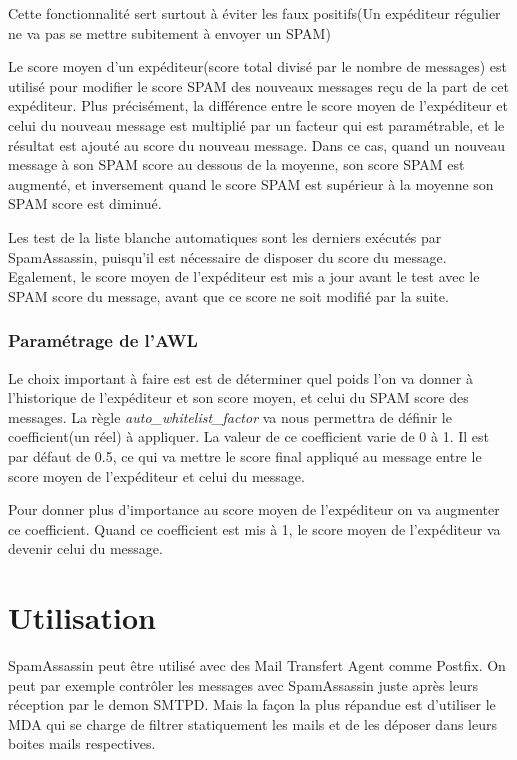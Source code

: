 \documentclass[a4paper,11pt]{article}
\begin{document}
Cette fonctionnalité sert surtout à éviter les faux positifs(Un expéditeur régulier ne va pas se mettre subitement à envoyer un SPAM)

Le score moyen d'un expéditeur(score total divisé par le nombre de messages) est utilisé pour modifier  
le score SPAM des nouveaux messages reçu de la part de cet expéditeur. Plus précisément, la différence entre le score 
moyen de l’expéditeur et celui du nouveau message est multiplié par un facteur qui est paramétrable,
et le résultat est ajouté au score du nouveau message. Dans ce cas, quand un nouveau message à son SPAM score 
au dessous de la moyenne, son score SPAM est augmenté, et inversement quand le score SPAM est supérieur à la moyenne
son SPAM score est diminué.

Les test de la liste blanche automatiques sont les derniers exécutés par SpamAssassin, puisqu'il est nécessaire de disposer du score du message.
Egalement, le score moyen de l'expéditeur est mis a jour avant le test avec le SPAM score du message, 
avant que ce score ne soit modifié par la suite.

\subsubsection{Paramétrage de l'AWL}
Le choix important à faire est est de déterminer quel poids l'on va donner à l'historique de l'expéditeur et son score moyen, et celui du SPAM score des messages.
La règle \emph{auto\_whitelist\_factor} va nous permettra de définir le coefficient(un réel) à appliquer. La valeur de ce coefficient 
varie de 0 à 1. Il est par défaut de 0.5, ce qui va mettre le score final appliqué au message entre le score moyen 
de l'expéditeur et celui du message. 

Pour donner plus d'importance au score moyen de l'expéditeur on va augmenter ce coefficient. Quand ce coefficient 
est mis à 1, le score moyen de l'expéditeur va devenir celui du message.



\section{Utilisation }


SpamAssassin peut être utilisé avec des Mail Transfert Agent comme Postfix. On peut par exemple contrôler les messages
avec SpamAssassin juste après leurs réception par le demon SMTPD. Mais la façon la plus répandue est d'utiliser le MDA qui se charge
de filtrer statiquement les mails et de les déposer dans leurs boites mails respectives. 
\end{document}
